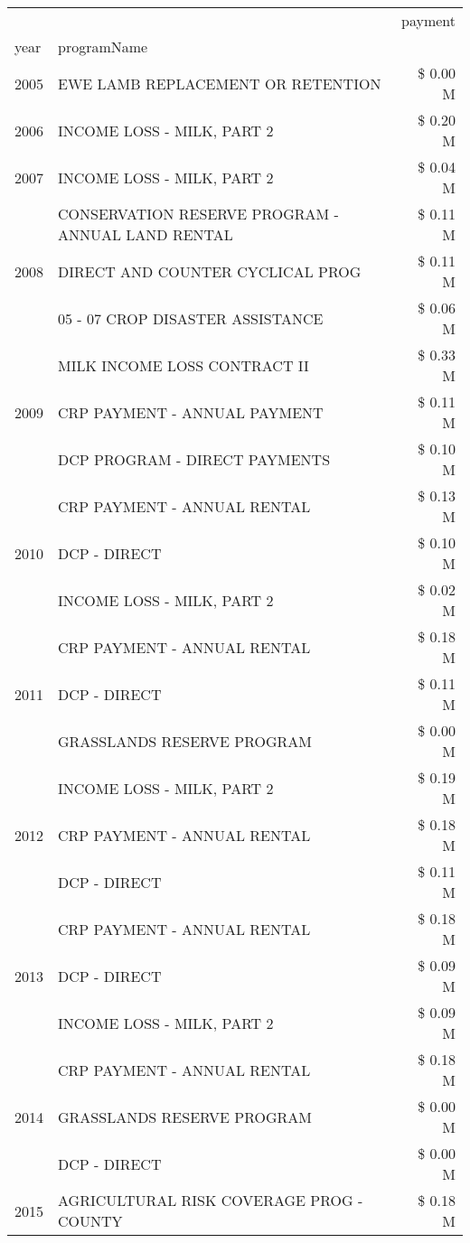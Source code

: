 \begin{tabular}{llr}
\toprule
 &  & payment \\
year & programName &  \\
\midrule
2005 & EWE LAMB REPLACEMENT OR RETENTION & \$ 0.00 M \\
\cline{1-3}
2006 & INCOME LOSS - MILK, PART 2 & \$ 0.20 M \\
\cline{1-3}
2007 & INCOME LOSS - MILK, PART 2 & \$ 0.04 M \\
\cline{1-3}
\multirow[t]{3}{*}{2008} & CONSERVATION RESERVE PROGRAM - ANNUAL LAND RENTAL & \$ 0.11 M \\
 & DIRECT AND COUNTER CYCLICAL PROG & \$ 0.11 M \\
 & 05 - 07 CROP DISASTER ASSISTANCE & \$ 0.06 M \\
\cline{1-3}
\multirow[t]{3}{*}{2009} & MILK INCOME LOSS CONTRACT II & \$ 0.33 M \\
 & CRP PAYMENT - ANNUAL PAYMENT & \$ 0.11 M \\
 & DCP PROGRAM - DIRECT PAYMENTS & \$ 0.10 M \\
\cline{1-3}
\multirow[t]{3}{*}{2010} & CRP PAYMENT - ANNUAL RENTAL & \$ 0.13 M \\
 & DCP - DIRECT & \$ 0.10 M \\
 & INCOME LOSS - MILK, PART 2 & \$ 0.02 M \\
\cline{1-3}
\multirow[t]{3}{*}{2011} & CRP PAYMENT - ANNUAL RENTAL & \$ 0.18 M \\
 & DCP - DIRECT & \$ 0.11 M \\
 & GRASSLANDS RESERVE PROGRAM & \$ 0.00 M \\
\cline{1-3}
\multirow[t]{3}{*}{2012} & INCOME LOSS - MILK, PART 2 & \$ 0.19 M \\
 & CRP PAYMENT - ANNUAL RENTAL & \$ 0.18 M \\
 & DCP - DIRECT & \$ 0.11 M \\
\cline{1-3}
\multirow[t]{3}{*}{2013} & CRP PAYMENT - ANNUAL RENTAL & \$ 0.18 M \\
 & DCP - DIRECT & \$ 0.09 M \\
 & INCOME LOSS - MILK, PART 2 & \$ 0.09 M \\
\cline{1-3}
\multirow[t]{3}{*}{2014} & CRP PAYMENT - ANNUAL RENTAL & \$ 0.18 M \\
 & GRASSLANDS RESERVE PROGRAM & \$ 0.00 M \\
 & DCP - DIRECT & \$ 0.00 M \\
\cline{1-3}
\multirow[t]{3}{*}{2015} & AGRICULTURAL RISK COVERAGE PROG - COUNTY & \$ 0.18 M \\

\end{tabular}
